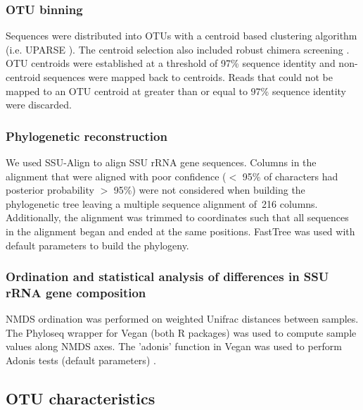 \documentclass{article}
\begin{document}
\subsubsection{OTU binning} 
Sequences were distributed into OTUs with a centroid based clustering
algorithm (i.e. UPARSE \citep{edgar2013}). The centroid selection also
included robust chimera screening \citep{edgar2013}. OTU centroids were
established at a threshold of 97\% sequence identity and non-centroid
sequences were mapped back to centroids. Reads that could not be mapped to
an OTU centroid at greater than or equal to 97\% sequence identity were
discarded. 

\subsubsection{Phylogenetic reconstruction}
We used SSU-Align \citep{nawrocki2009,nawrocki2013} to align SSU rRNA gene
sequences. Columns in the alignment that were aligned with poor confidence
($<$ 95\% of characters had posterior probability $>$ 95\%) were not considered
when building the phylogenetic tree leaving a multiple sequence alignment
of~216 columns. Additionally, the alignment was trimmed to coordinates such
that all sequences in the alignment began and ended at the same positions.
FastTree \citep{price2010} was used with default parameters to build the
phylogeny. 

\subsubsection{Ordination and statistical analysis of differences in SSU rRNA
gene composition} 
NMDS ordination was performed on weighted Unifrac \citep{lozupone2005}
distances between samples. The Phyloseq \citep{mcmurdie2013} wrapper for Vegan
\citep{oksanen2015} (both R packages) was used to compute sample values along
NMDS axes. The 'adonis' function in Vegan was used to perform Adonis tests
(default parameters) \citep{Anderson2001a}.


\subsection{OTU characteristics}
\end{document}

